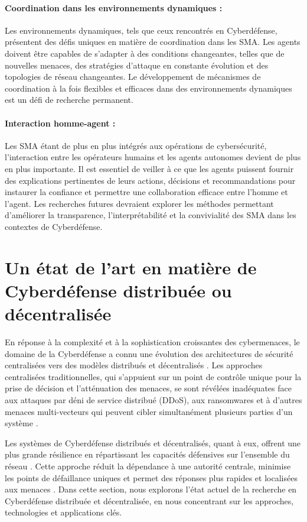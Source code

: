 \paragraph{Coordination dans les environnements dynamiques :}
Les environnements dynamiques, tels que ceux rencontrés en Cyberdéfense, présentent des défis uniques en matière de coordination dans les SMA. Les agents doivent être capables de s'adapter à des conditions changeantes, telles que de nouvelles menaces, des stratégies d'attaque en constante évolution et des topologies de réseau changeantes. Le développement de mécanismes de coordination à la fois flexibles et efficaces dans des environnements dynamiques est un défi de recherche permanent.

\paragraph{Interaction homme-agent :}
Les SMA étant de plus en plus intégrés aux opérations de cybersécurité, l’interaction entre les opérateurs humains et les agents autonomes devient de plus en plus importante. Il est essentiel de veiller à ce que les agents puissent fournir des explications pertinentes de leurs actions, décisions et recommandations pour instaurer la confiance et permettre une collaboration efficace entre l’homme et l’agent. Les recherches futures devraient explorer les méthodes permettant d’améliorer la transparence, l’interprétabilité et la convivialité des SMA dans les contextes de Cyberdéfense.



\section{Un état de l'art en matière de Cyberdéfense distribuée ou décentralisée}

En réponse à la complexité et à la sophistication croissantes des cybermenaces, le domaine de la Cyberdéfense a connu une évolution des architectures de sécurité centralisées vers des modèles distribués et décentralisés \cite{Chen2021, Misra2023}. Les approches centralisées traditionnelles, qui s'appuient sur un point de contrôle unique pour la prise de décision et l'atténuation des menaces, se sont révélées inadéquates face aux attaques par déni de service distribué (DDoS), aux ransomwares et à d'autres menaces multi-vecteurs qui peuvent cibler simultanément plusieurs parties d'un système \cite{Munsing2018}.

Les systèmes de Cyberdéfense distribués et décentralisés, quant à eux, offrent une plus grande résilience en répartissant les capacités défensives sur l'ensemble du réseau \cite{Oliynykov2022}. Cette approche réduit la dépendance à une autorité centrale, minimise les points de défaillance uniques et permet des réponses plus rapides et localisées aux menaces \cite{Kott2021}. Dans cette section, nous explorons l'état actuel de la recherche en Cyberdéfense distribuée et décentralisée, en nous concentrant sur les approches, technologies et applications clés.


